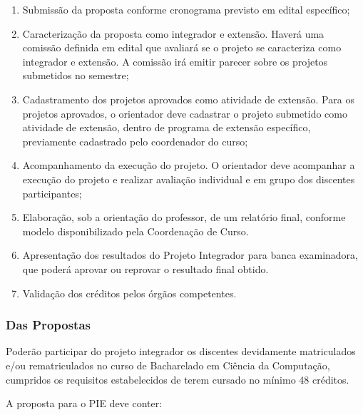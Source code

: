 \begin{enumerate}
    
\item Submissão da proposta conforme cronograma previsto em edital específico;

\item Caracterização da proposta como integrador e extensão. Haverá uma comissão definida em edital que avaliará se o projeto se caracteriza como integrador e extensão. A comissão irá emitir parecer sobre os projetos submetidos no semestre;

\item Cadastramento dos projetos aprovados como atividade de extensão. Para os projetos aprovados, o orientador deve cadastrar o projeto submetido como atividade de extensão, dentro de programa de extensão específico, previamente cadastrado pelo coordenador do curso;

\item Acompanhamento da execução do projeto. O orientador deve acompanhar a execução do projeto e realizar avaliação individual e em grupo dos discentes participantes;

\item Elaboração, sob a orientação do professor, de um relatório final, conforme modelo disponibilizado pela Coordenação de Curso.

\item Apresentação dos resultados do Projeto Integrador para banca examinadora, que poderá aprovar ou reprovar o resultado final obtido. 

\item Validação dos créditos pelos órgãos competentes.

\end{enumerate}

\subsubsection{Das Propostas}

Poderão participar do projeto integrador os discentes devidamente matriculados e/ou rematriculados no curso de Bacharelado em Ciência da Computação, cumpridos os requisitos estabelecidos de terem cursado no mínimo 48 créditos.

A proposta para o PIE deve conter:

